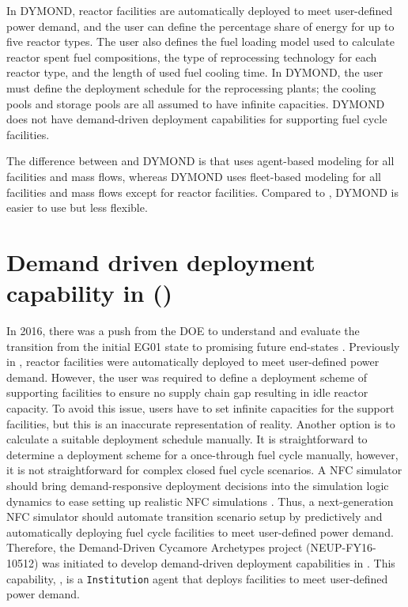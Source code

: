 In DYMOND, reactor facilities are automatically deployed to 
meet user-defined power demand, and the user can define 
the percentage share of energy for up to five reactor types. 
The user also defines the fuel loading model used to calculate 
reactor spent fuel compositions, the type of reprocessing 
technology for each reactor type, and the length 
of used fuel cooling time. 
In DYMOND, the user must define the deployment schedule for 
the reprocessing plants; the cooling pools and storage pools 
are all assumed to have infinite capacities. 
DYMOND does not have demand-driven deployment capabilities for 
supporting fuel cycle facilities. 

The difference between \Cyclus and DYMOND is that \Cyclus uses 
agent-based modeling for all facilities and mass flows, 
whereas DYMOND uses fleet-based modeling for all facilities and 
mass flows except for reactor facilities. 
Compared to \Cyclus, DYMOND is easier to use but less flexible. 

\section{Demand driven deployment capability in \Cyclus (\deploy)}
In 2016, there was a push from the DOE to understand and evaluate the 
transition from the initial EG01 state to promising future 
end-states \cite{feng_standardized_2016}.
Previously in \Cyclus, reactor facilities were automatically 
deployed to meet user-defined power demand. 
However, the user was required to define a deployment scheme of 
supporting facilities to ensure no supply chain 
gap resulting in idle reactor capacity. 
To avoid this issue, users 
have to set infinite capacities for the support facilities, 
but this is an inaccurate representation of reality. 
Another option is to calculate a suitable deployment schedule manually.
It is straightforward to determine a deployment scheme for a once-through 
fuel cycle manually, however, it is not straightforward for complex 
closed fuel cycle scenarios.
A \gls{NFC} simulator should bring demand-responsive deployment decisions into 
the simulation logic dynamics to ease setting up realistic \gls{NFC} 
simulations \cite{huff_current_2017}. 
Thus, a next-generation \gls{NFC} simulator should automate 
transition scenario setup by predictively and 
automatically deploying fuel cycle facilities to meet user-defined 
power demand. 
Therefore, the Demand-Driven Cycamore Archetypes project
(NEUP-FY16-10512) was initiated to develop demand-driven deployment 
capabilities in \Cyclus.
This capability, \deploy, is a \Cyclus \texttt{Institution}
agent that deploys facilities to meet user-defined power demand. 

